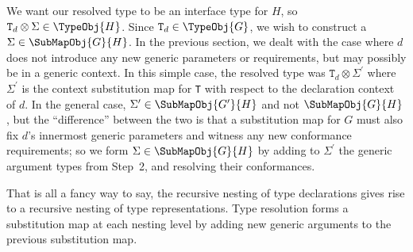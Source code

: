 \documentclass[../generics]{subfiles}
\begin{document}
We want our resolved type to be an interface type for $H$, so $\texttt{T}_d\otimes\Sigma\in\TypeObj{H}$. Since $\texttt{T}_d\in\TypeObj{G}$, we wish to construct a $\Sigma\in\SubMapObj{G}{H}$. In the previous section, we dealt with the case where $d$ does not introduce any new generic parameters or requirements, but may possibly be in a generic context. In this simple case, the resolved type was $\texttt{T}_d\otimes\Sigma^\prime$ where  $\Sigma^\prime$ is the context substitution map for \texttt{T} with respect to the declaration context of $d$. In the general case, $\Sigma^\prime\in\SubMapObj{G^\prime}{H}$ and not $\SubMapObj{G}{H}$, but the ``difference'' between the two is that a substitution map for $G$ must also fix $d$'s innermost generic parameters and witness any new conformance requirements; so we form $\Sigma\in\SubMapObj{G}{H}$ by adding to $\Sigma^\prime$ the generic argument types from Step~2, and resolving their conformances.

That is all a fancy way to say, the recursive nesting of type declarations gives rise to a recursive nesting of type representations. Type resolution forms a substitution map at each nesting level by adding new generic arguments to the previous substitution map.
\end{document}
